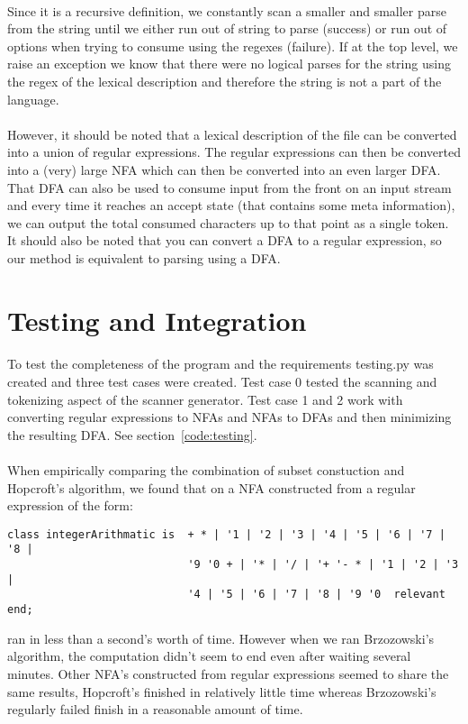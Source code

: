 \documentclass{article}
\begin{document}
\paragraph{} Since it is a recursive definition, we constantly scan a
smaller and smaller parse from the string until we either run out of
string to parse (success) or run out of options when trying to consume
using the regexes (failure). If at the top level, we raise an
exception we know that there were no logical parses for the string
using the regex of the lexical description and therefore the string is
not a part of the language.


\paragraph{} However, it should be noted that a lexical description
of the file can be converted into a union of regular expressions. The
regular expressions can then be converted into a (very) large NFA
which can then be converted into an even larger DFA. That DFA can also
be used to consume input from the front on an input stream and every
time it reaches an accept state (that contains some meta information),
we can output the total consumed characters up to that point as a
single token.  It should also be noted that you can convert a DFA to a
regular expression, so our method is equivalent to parsing using a
DFA.

\section{Testing and Integration}
\paragraph{} To test the completeness of the program and the requirements
testing.py was created and three test cases were created. Test case 0
tested the scanning and tokenizing aspect of the scanner generator.
Test case 1 and 2 work with converting regular expressions to NFAs and
NFAs to DFAs and then minimizing the resulting DFA. See
section~\ref{code:testing}.

\paragraph{} When empirically comparing the combination of subset 
constuction and Hopcroft's algorithm, we found that on a NFA constructed
from a regular expression of the form:
\begin{verbatim}
class integerArithmatic is  + * | '1 | '2 | '3 | '4 | '5 | '6 | '7 | '8 |
                            '9 '0 + | '* | '/ | '+ '- * | '1 | '2 | '3 | 
                            '4 | '5 | '6 | '7 | '8 | '9 '0  relevant end;
\end{verbatim}
ran in less than a second's worth of time. However when we ran
Brzozowski's algorithm, the computation didn't seem to end even after
waiting several minutes. Other NFA's constructed from regular expressions
seemed to share the same results, Hopcroft's finished in relatively
little time whereas Brzozowski's regularly failed finish in a reasonable
amount of time.
\end{document}
